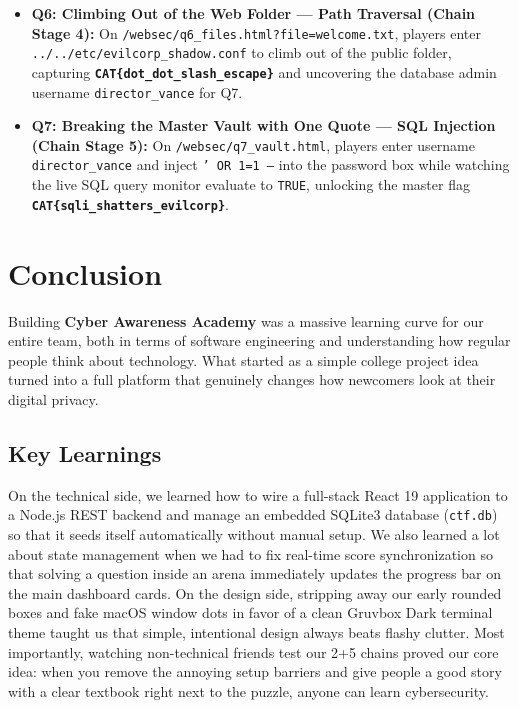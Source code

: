\documentclass[11pt,a4paper]{article}
\begin{document}
\begin{itemize}
    \item \textbf{Q6: Climbing Out of the Web Folder --- Path Traversal (Chain Stage 4):} On \texttt{/websec/\allowbreak q6\_files.html?\allowbreak file=welcome.txt}, players enter \texttt{../../etc/\allowbreak evilcorp\_shadow.conf} to climb out of the public folder, capturing \textbf{\texttt{CAT\{dot\_dot\_slash\_escape\}}} and uncovering the database admin username \texttt{director\_vance} for Q7.
    \item \textbf{Q7: Breaking the Master Vault with One Quote --- SQL Injection (Chain Stage 5):} On \texttt{/websec/q7\_vault.html}, players enter username \texttt{director\_vance} and inject \texttt{' OR 1=1 --} into the password box while watching the live SQL query monitor evaluate to \texttt{TRUE}, unlocking the master flag \textbf{\texttt{CAT\{sqli\_shatters\_evilcorp\}}}.
\end{itemize}

\clearpage

\section{Conclusion}

Building \textbf{Cyber Awareness Academy} was a massive learning curve for our entire team, both in terms of software engineering and understanding how regular people think about technology. What started as a simple college project idea turned into a full platform that genuinely changes how newcomers look at their digital privacy.

\subsection{Key Learnings}
On the technical side, we learned how to wire a full-stack React 19 application to a Node.js REST backend and manage an embedded SQLite3 database (\texttt{ctf.db}) so that it seeds itself automatically without manual setup. We also learned a lot about state management when we had to fix real-time score synchronization so that solving a question inside an arena immediately updates the progress bar on the main dashboard cards. On the design side, stripping away our early rounded boxes and fake macOS window dots in favor of a clean Gruvbox Dark terminal theme taught us that simple, intentional design always beats flashy clutter. Most importantly, watching non-technical friends test our 2+5 chains proved our core idea: when you remove the annoying setup barriers and give people a good story with a clear textbook right next to the puzzle, anyone can learn cybersecurity.
\end{document}
